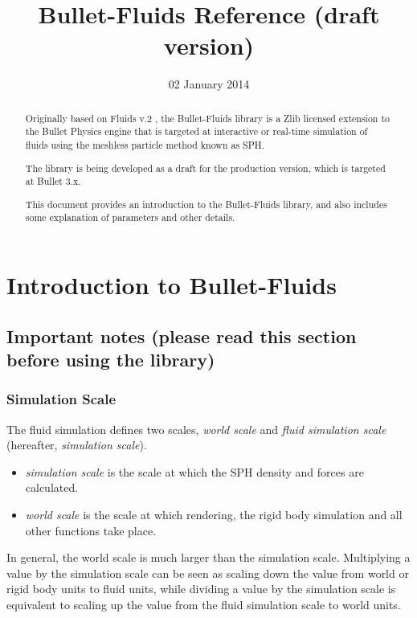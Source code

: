 \documentclass[]{article}
\title{Bullet-Fluids Reference (draft version)}
\author{}
\date{02 January 2014}
\begin{document}
\maketitle

\begin{abstract}
	Originally based on Fluids v.2 \cite{RH:2008}, the Bullet-Fluids library is a Zlib licensed extension to the Bullet
	Physics engine \cite{EC:2012} that is targeted at interactive or real-time simulation of fluids using the meshless 
	particle method known as SPH. 
	
	The library is being developed as a draft for the production version, which is targeted at Bullet 3.x.
	
	This document provides an introduction to the Bullet-Fluids library, and also includes some explanation of 
	parameters and other details.
\end{abstract}

\tableofcontents

\pagebreak
\section{Introduction to Bullet-Fluids}
	\label{s_bulletFluidsIntro}
	
	\subsection{Important notes (please read this section before using the library)}
		\subsubsection{Simulation Scale}
			\label{s_simulationScale}
			The fluid simulation defines two scales, \textit{world scale} and \textit{fluid simulation scale} 
			(hereafter, \textit{simulation scale}).
			\begin{itemize}
				\item \textit{simulation scale} is the scale at which the SPH density and forces are calculated.
				\item \textit{world scale} is the scale at which rendering, the rigid body simulation and all other functions take place.
			\end{itemize}
			
			In general, the world scale is much larger than the simulation scale. Multiplying a value by the simulation 
			scale can be seen as scaling down the value from world or rigid body units to fluid units, while dividing a 
			value by the simulation scale is equivalent to scaling up the value from the fluid simulation scale to world units.
			
\end{document}
